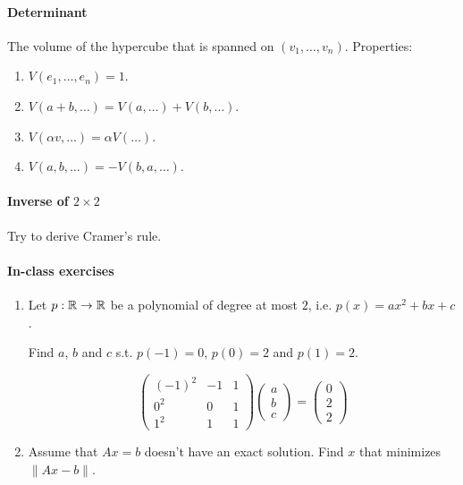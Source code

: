 \documentclass{article}
\begin{document}
\paragraph{Determinant} The volume of the hypercube that is spanned on $(v_1,\dots,v_n)$. Properties:
\begin{enumerate}
    \item $V(e_1, \dots, e_n) = 1$.
    \item $V(a+b, \dots) = V(a, \dots) + V(b, \dots)$.
    \item $V(\alpha v, \dots) = \alpha V(\dots)$.
    \item $V(a, b, \dots) = -V(b, a, \dots)$.
\end{enumerate}

\paragraph{Inverse of $2 \times 2$} Try to derive Cramer's rule.

\paragraph{In-class exercises}

\begin{enumerate}
    \item Let $p : \mathbb{R} \to \mathbb{R}$ be a polynomial of degree at most $2$, i.e. $p(x) = ax^2+bx+c$.
    
    Find $a$, $b$ and $c$ s.t. $p(-1)=0$, $p(0)=2$ and $p(1) = 2$.

    $$
    \begin{pmatrix}
        (-1)^2 & -1 & 1 \\
        0^2 & 0 & 1 \\
        1^2 & 1 & 1
    \end{pmatrix} \begin{pmatrix} a \\ b \\ c \end{pmatrix} = 
    \begin{pmatrix}0 \\ 2 \\ 2\end{pmatrix}
    $$
    \item Assume that $Ax=b$ doesn't have an exact solution. Find $x$ that minimizes $\|Ax-b\|$.
\end{enumerate}
\end{document}
